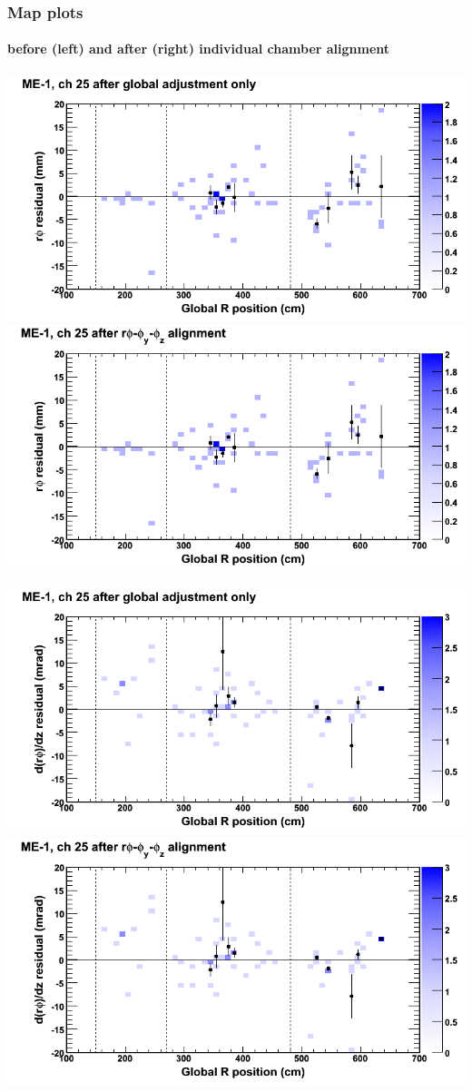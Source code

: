 \documentclass[compress]{beamer}
\begin{document}
\begin{frame}
\frametitle{Map plots}
\framesubtitle{before (left) and after (right) individual chamber alignment}
\includegraphics[width=0.5\linewidth]{ringmapplots_3dof/before_CSCvsr_mem1ch25_x.png} \includegraphics[width=0.5\linewidth]{ringmapplots_3dof/after_CSCvsr_mem1ch25_x.png}

\includegraphics[width=0.5\linewidth]{ringmapplots_3dof/before_CSCvsr_mem1ch25_dxdz.png} \includegraphics[width=0.5\linewidth]{ringmapplots_3dof/after_CSCvsr_mem1ch25_dxdz.png}
\end{frame}
\end{document}

